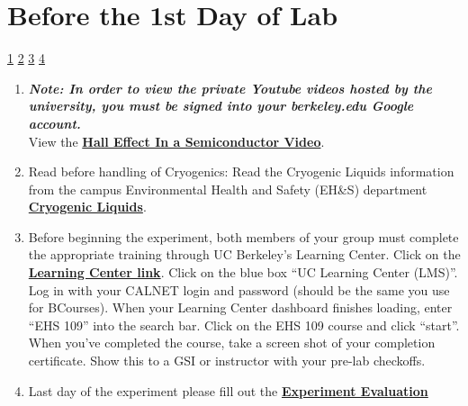 \documentclass{../lab}
\begin{document}
\section{Before the 1st Day of Lab}

\signatures \hyperlink{Hall Coefficient and Van der Pauw Method}{1} \hyperlink{Apparatus and Procedures}{2} \hyperlink{Extrapolating Data}{3} \hyperlink{Electron or Hole Concentrations}{4}

\begin{enumerate}
    \item \emph{\textbf{Note: In order to view the private Youtube videos hosted by the university, you must be signed into your berkeley.edu Google account.}}\\
    View the \href{http://youtu.be/7JYq1rRl6Xk}{\textbf{Hall Effect In a Semiconductor Video}}.

    \item Read before handling of Cryogenics: Read the Cryogenic Liquids information from the campus Environmental Health and Safety (EH\&S) department \href{https://berkeley-physics111b.github.io/assets/pdf/oldwebsitestructure/images/77cryogenic.pdf}{\textbf{Cryogenic Liquids}}.

    \item Before beginning the experiment, both members of your group must complete the appropriate training through UC Berkeley's Learning Center. Click on the \href{https://ucpath.berkeley.edu/uc-learning-center-lms} {\textbf{Learning Center link}}. Click on the blue box ``UC Learning Center (LMS)''. Log in with your CALNET login and password (should be the same you use for BCourses). When your Learning Center dashboard finishes loading, enter ``EHS 109'' into the search bar. Click on the EHS 109 course and click ``start''. When you've completed the course, take a screen shot of your completion certificate. Show this to a GSI or instructor with your pre-lab checkoffs.

    \item Last day of the experiment please fill out the \href{\ExperimentEvaluation}{\textbf{Experiment Evaluation}}

\end{enumerate}


\end{document}
